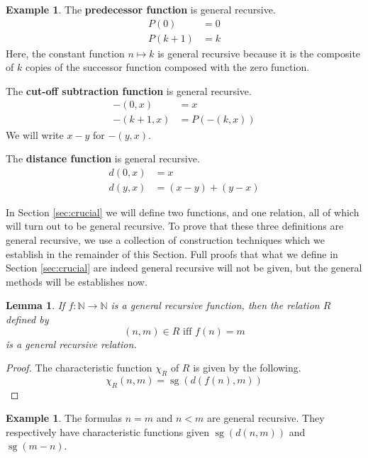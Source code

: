 \documentclass[12pt]{article}
\theoremstyle{plain}
\newtheorem{lemma}[thm]{Lemma}
\theoremstyle{definition}
\newtheorem{example}[thm]{Example}
\newcommand{\bb}[1]{\mathbb{#1}}
\newcommand{\lto}{\longrightarrow}
\begin{document}
	\begin{example}\label{ex:basic_prim_rec}
		The \textbf{predecessor function} is general recursive.
		\begin{align*}
			P(0) &= 0\\
			P(k+1) &= k
		\end{align*}
		Here, the constant function $n \longmapsto k$ is general recursive because it is the composite of $k$ copies of the successor function composed with the zero function.
		
		The \textbf{cut-off subtraction function} is general recursive.
		\begin{align*}
			-(0,x) &= x\\
			-(k+1,x) &= P(-(k,x))
		\end{align*}
		We will write $x - y$ for $-(y,x)$.
		
		The \textbf{distance function} is general recursive.
		\begin{align*}
			d(0,x) &= x\\
			d(y,x) &= (x - y) + (y - x)
		\end{align*}
	\end{example}
	In Section \ref{sec:crucial} we will define two functions, and one relation, all of which will turn out to be general recursive. To prove that these three definitions are general recursive, we use a collection of construction techniques which we establish in the remainder of this Section. Full proofs that what we define in Section \ref{sec:crucial} are indeed general recursive will not be given, but the general methods will be establishes now.
	\begin{lemma}
		If $f: \bb{N} \lto \bb{N}$ is a general recursive function, then the relation $R$ defined by
		\begin{equation}
			(n,m) \in R \text{ iff } f(n) = m
		\end{equation}
		is a general recursive relation.
	\end{lemma}
	\begin{proof}
		The characteristic function $\chi_R$ of $R$ is given by the following.
		\begin{equation}
			\chi_R(n,m) = \operatorname{sg}(d(f(n),m))
		\end{equation}
	\end{proof}
	\begin{example}
		The formulas $n = m$ and $n < m$ are general recursive. They respectively have characteristic functions given $\operatorname{sg}(d(n,m))$ and $ \operatorname{sg}(m-n)$.
	\end{example}
\end{document}
